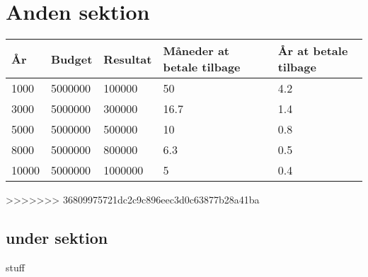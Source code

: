 \section{Anden sektion}


\begin{tabularx}{0.75\textwidth}{|X|X|X|X|X|}
\hline
År & Budget & Resultat & Måneder at betale tilbage & År at betale tilbage \\ \hline \hline
1000 & 5000000 & 100000 & 50 & 4.2 \\ \hline
3000 & 5000000 & 300000 & 16.7 & 1.4 \\ \hline
5000 & 5000000 & 500000 & 10 & 0.8 \\ \hline
8000 & 5000000 & 800000 & 6.3 & 0.5 \\ \hline
10000 & 5000000 & 1000000 & 5 & 0.4 \\ \hline
\end{tabularx}


>>>>>>> 36809975721dc2c9c896eec3d0c63877b28a41ba
\subsection{under sektion}

\cite{HTL}stuff
